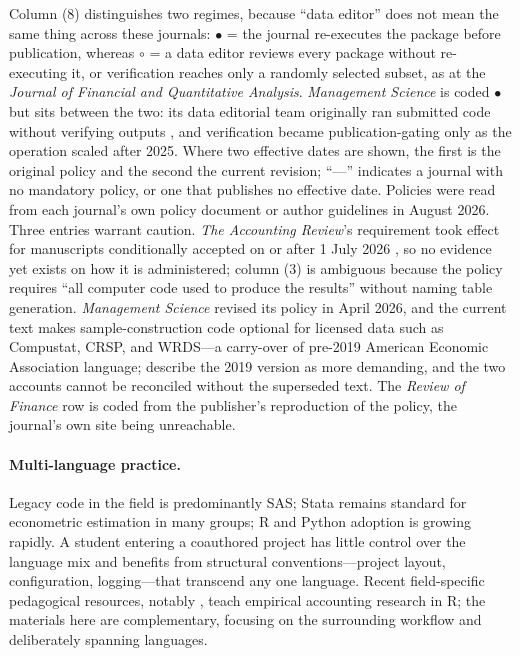 \documentclass[12pt]{article}
\begin{document}
\begin{table}[htbp]
\begin{minipage}{\textwidth}
Column (8) distinguishes two regimes, because ``data editor'' does not
mean the same thing across these journals: $\bullet$ = the journal
re-executes the package before publication, whereas $\circ$ = a data
editor reviews every package without re-executing it, or verification
reaches only a randomly selected subset, as at the \textit{Journal of
Financial and Quantitative Analysis}. \textit{Management Science} is
coded $\bullet$ but sits between the two: its data editorial team
originally ran submitted code without verifying outputs
\citep{fisar2024}, and verification became publication-gating only as
the operation scaled after 2025. Where two effective dates
are shown, the first is the original policy and the second the current
revision; ``---'' indicates a journal with no mandatory policy, or one
that publishes no effective date. Policies were read from each
journal's own policy document or author guidelines in August 2026.
Three entries warrant caution. \textit{The Accounting Review}'s
requirement took effect for manuscripts conditionally accepted on or
after 1 July 2026 \citep{AAApolicy}, so no evidence yet exists on how
it is administered; column (3) is ambiguous because the policy requires
``all computer code used to produce the results'' without naming table
generation. \textit{Management Science} revised its policy in April
2026, and the current text makes sample-construction code optional for
licensed data such as Compustat, CRSP, and WRDS---a carry-over of
pre-2019 American Economic Association language; \citet{barrios2026mandated}
describe the 2019 version as more demanding, and the two accounts cannot
be reconciled without the superseded text. The \textit{Review of
Finance} row is coded from the publisher's reproduction of the policy,
the journal's own site being unreachable.
\end{minipage}
\end{table}

\paragraph{Multi-language practice.}
Legacy code in the field is predominantly SAS; Stata remains standard for
econometric estimation in many groups; R and Python adoption is growing
rapidly. A student entering a coauthored project has little control over
the language mix and benefits from structural
conventions---project layout, configuration, logging---that transcend any
one language. Recent field-specific pedagogical resources, notably
\citet{gow2024empirical}, teach empirical accounting research in R; the
materials here are complementary, focusing on the surrounding workflow
and deliberately spanning languages.
\end{document}

